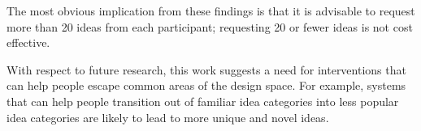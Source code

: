 The most obvious implication from these findings is that it is advisable to request more than 20 ideas from each participant; requesting 20 or fewer ideas is not cost effective.

With respect to future research, this work suggests a need for interventions that can help people escape common areas of the design space. For example, systems that can help people transition out of familiar idea categories into less popular idea categories are likely to lead to more unique and novel ideas.
